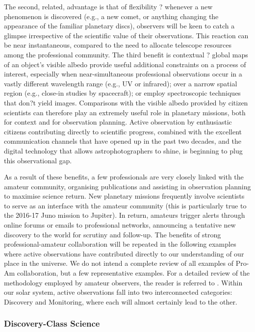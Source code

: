 \documentclass{ar2e}
\begin{document}
The second, related, advantage is that of flexibility ? whenever a new
phenomenon is discovered (e.g., a new comet, or anything changing the
appearance of the familiar planetary discs), observers will be keen to catch a
glimpse irrespective of the scientific value of their observations.  This
reaction can be near instantaneous, compared to the need to allocate telescope
resources among the professional community.  The third benefit is contextual ?
global maps of an object's visible albedo provide useful additional
constraints on a process of interest, especially when near-simultaneous
professional observations occur in a vastly different wavelength range (e.g.,
UV or infrared); over a narrow spatial region (e.g., close-in studies by
spacecraft); or employ spectroscopic techniques that don?t yield images. 
Comparisons with the visible albedo provided by citizen scientists can
therefore play an extremely useful role in planetary missions, both for
context and for observation planning.  Active observation by enthusiastic
citizens contributing directly to scientific progress, combined with the
excellent communication channels that have opened up in the past two decades,
and the digital technology that allows astrophotographers to shine, is
beginning to plug this observational gap.

As a result of these benefits, a few professionals are very closely linked
with the amateur community, organising publications and assisting in
observation planning to maximise science return.  New planetary missions
frequently involve scientists to serve as an interface with the amateur
community (this is particularly true to the 2016-17 Juno mission to Jupiter). 
In return, amateurs trigger alerts through online forums or emails to
professional networks, announcing a tentative new discovery to the world for
scrutiny and follow-up. The benefits of strong professional-amateur
collaboration will be repeated in the following examples where active
observations have contributed directly to our understanding of our place in
the universe.  We do not intend a complete review of all examples of Pro-Am
collaboration, but a few representative examples.  For a detailed review of
the methodology employed by amateur observers, the reader is referred to
\citet{13mousis}.  Within our solar system, active observations fall into two
interconnected categories:  Discovery and Monitoring, where each will almost
certainly lead to the other.
 
\subsubsection{Discovery-Class Science}
\end{document}
